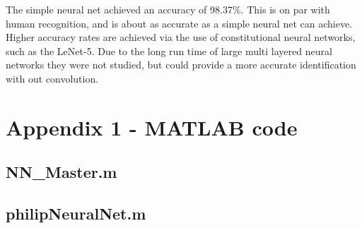 \documentclass[12pt]{article}
\begin{document}
	The simple neural net achieved an accuracy of 98.37\%. This is on par with human recognition, and is about as accurate as a simple neural net can achieve. Higher accuracy rates are achieved via the use of constitutional neural networks, such as the  LeNet-5\cite{len5en}. Due to the long run time of large multi layered neural networks they were not studied, but could provide a more accurate identification with out convolution.

		
		
		

		
		\newpage
		\singlespacing
		\section*{Appendix 1 - MATLAB code}
		
	\subsection*{NN\_Master.m}
	
	\subsection*{philipNeuralNet.m}
	
	
\end{document}
